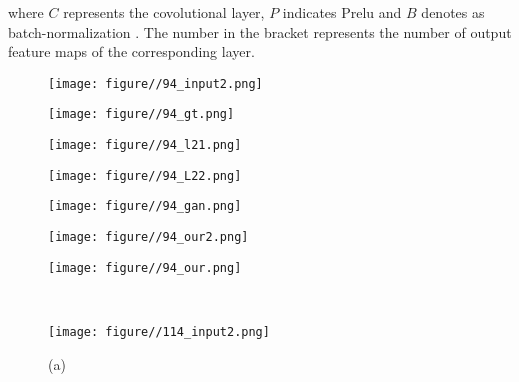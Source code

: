 \documentclass[10pt,twocolumn,letterpaper]{article}
\begin{document}
\noindent where $C$ represents the covolutional layer,  $P$ indicates Prelu \cite{prelu} and $B$ denotes as batch-normalization \cite{batch_norm}. The number in the bracket represents the number of output feature maps of the corresponding layer.
\begin{figure*}[!]
	\centering
	\begin{minipage}{.135\textwidth}
			\centering
			\texttt{[image: figure//94\_input2.png]}
			\captionsetup{labelformat=empty}
			\captionsetup{justification=centering}
	\end{minipage}
	\begin{minipage}{.135\textwidth}
		\centering
		\texttt{[image: figure//94\_gt.png]}
		\captionsetup{labelformat=empty}
		\captionsetup{justification=centering}
	\end{minipage}
	\begin{minipage}{.135\textwidth}
		\centering
		\texttt{[image: figure//94\_l21.png]}
		\captionsetup{labelformat=empty}
		\captionsetup{justification=centering}
	\end{minipage}	
	\begin{minipage}{.135\textwidth}
			\centering
			\texttt{[image: figure//94\_L22.png]}
			\captionsetup{labelformat=empty}
			\captionsetup{justification=centering}
	\end{minipage}
	\begin{minipage}{.135\textwidth}
		\centering
		\texttt{[image: figure//94\_gan.png]}
		\captionsetup{labelformat=empty}
		\captionsetup{justification=centering}
	\end{minipage}
	\begin{minipage}{.135\textwidth}
		\centering
		\texttt{[image: figure//94\_our2.png]}
		\captionsetup{labelformat=empty}
		\captionsetup{justification=centering}
	\end{minipage}
	\begin{minipage}{.135\textwidth}
		\centering
		\texttt{[image: figure//94\_our.png]}
		\captionsetup{labelformat=empty}
		\captionsetup{justification=centering}
	\end{minipage}\\  
	\begin{minipage}{.135\textwidth}
			\centering
			\texttt{[image: figure//114\_input2.png]}
			\captionsetup{labelformat=empty}
			\captionsetup{justification=centering}
			\caption*{(a)}
	\end{minipage}

\end{figure*}
\end{document}
